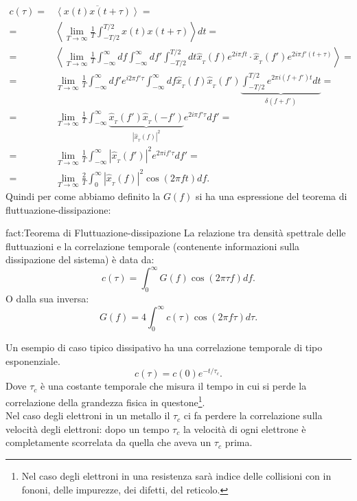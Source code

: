 \[\begin{aligned}
	c( \tau ) 
	=&
		\overline{\left<x( t) x( t+\tau ) \right>}= \\
	=&
		\left<
		\lim_{T \to \infty} \frac{1}{T}
		\int_{-T /2}^{T /2} x( t) x( t + \tau ) 
		\right>dt =\\
	=&
		\left<
		\lim_{T \to \infty} \frac{1}{T}
		\int_{-\infty}^{\infty}df
		\int_{-\infty}^{\infty}df'
		\int_{-T /2}^{T /2}dt
		\hat{x}_{_T} ( f) 
		e^{2i\pi f t}\cdot \hat{x}_{_T} ( f') 
		e^{2i\pi f' \left( t +\tau  \right) }
		\right>=\\
	=&
		\lim_{T \to \infty} \frac{1}{T} 
		\int_{-\infty}^{\infty} df'e^{i 2\pi f'\tau }
		\int_{-\infty}^{\infty}df\hat{x}_{_T}(f)\hat{x}_{_T}(f')
		\underbrace{
			\int_{-T/2}^{T/2}e^{2\pi i \left( f+f' \right)t}dt
		}_{\delta(f+f')}=\\
	=&
		\lim_{T \to \infty} \frac{1}{T}
		\int_{-\infty}^{\infty}
		\underbrace{
		\hat{x}_{_T}( f') \hat{x}_{_T}(-f')
		}_{\left| \hat{x}_{_T}(f) \right|^2}
		e^{2i\pi f' \tau }df'=\\
	=&
		\lim_{T \to \infty} \frac{1}{T}
		\int_{-\infty}^{\infty} 
		\left| \hat{x}_{_T}( f')  \right| ^2 
		e^{2\pi i f'\tau }df' =\\
	=&
		\lim_{T \to \infty} \frac{2}{T}
		\int_{0}^{\infty}
		\left| \hat{x}_{_T}(f) \right|^2 
		\cos(2\pi ft) df 
.\end{aligned}\]
Quindi per come abbiamo definito la $G(f)$ si ha una espressione del teorema di fluttuazione-dissipazione:
\begin{fact}{fact:Teorema di Fluttuazione-dissipazione}
	La relazione tra densità spettrale delle fluttuazioni e la correlazione temporale (contenente informazioni sulla dissipazione del sistema) è data da:
	\[
	c(\tau)=\int_{0}^{\infty} G(f)\cos(2\pi\tau f)df  
	.\] 
	O dalla sua inversa:
	\[
	G( f) = 4\int_{0}^{\infty}c(\tau)\cos(2\pi f\tau)d\tau   
	.\]
\end{fact}
Un esempio di caso tipico dissipativo ha una correlazione temporale di tipo esponenziale.
\[
	c( \tau ) = c( 0) e^{- t/\tau _c}
.\] 
Dove $\tau_c$ è una costante temporale che misura il tempo in cui si perde la correlazione della grandezza fisica in questone\footnote{Nel caso degli elettroni in una resistenza sarà indice delle collisioni con in fononi, delle impurezze, dei difetti, del reticolo.}.\\
Nel caso degli elettroni in un metallo il $\tau_c$ ci fa perdere la correlazione sulla velocità degli elettroni: dopo un tempo $\tau_c$ la velocità di ogni elettrone è completamente scorrelata da quella che aveva un $\tau_c$ prima.\\
